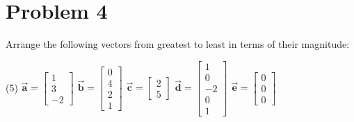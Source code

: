 \documentclass[letter,11pt]{article}
\theoremstyle{definition}
\begin{document}
\newpage
\section{Problem 4}
Arrange the following vectors from greatest to least in terms of their magnitude:

\begin{tasks}(5)
    \task $\vec{\boldsymbol{a}} = \begin{bmatrix}1 \\ 3 \\ -2\end{bmatrix}$
    \task $\vec{\boldsymbol{b}} = \begin{bmatrix}0 \\ 4 \\ 2 \\ 1\end{bmatrix}$
    \task $\vec{\boldsymbol{c}} = \begin{bmatrix}2 \\ 5\end{bmatrix}$
    \task $\vec{\boldsymbol{d}} = \begin{bmatrix}1 \\ 0 \\ -2 \\ 0 \\ 1\end{bmatrix}$
    \task $\vec{\boldsymbol{e}} = \begin{bmatrix}0 \\ 0 \\ 0\end{bmatrix}$
\end{tasks}
\end{document}
